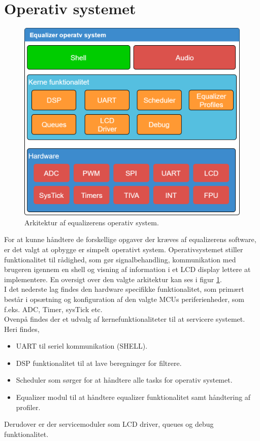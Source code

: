 \section{Operativ systemet}

\begin{figure}[h!]
	\centering
	\includegraphics[width=.5\textwidth]{billeder/eq_os.png}
	\caption{Arkitektur af equalizerens operativ system.}
	\label{fig:eq_os}
\end{figure}

For at kunne håndtere de forskellige opgaver der kræves af equalizerens software, er det valgt at opbygge er simpelt operativt system.
Operativsystemet stiller funktionalitet til rådighed, som gør signalbehandling, kommunikation med brugeren igennem en shell og visning af information i et LCD display lettere at implementere. En oversigt over den valgte arkitektur kan ses i figur \ref{fig:eq_os}.\\

I det nederste lag findes den hardware specifikke funktionalitet, som primært består i opsætning og konfiguration af den valgte MCUs periferienheder, som f.eks. ADC, Timer, sysTick etc.\\
 
Ovenpå findes der et udvalg af kernefunktionaliteter til at servicere systemet. Heri findes,
\begin{itemize}[noitemsep,nolistsep]
	\item UART til seriel kommunikation (SHELL).
	\item DSP funktionalitet til at lave beregninger for filtrere.
	\item Scheduler som sørger for at håndtere alle tasks for operativ systemet.
	\item Equalizer modul til at håndtere equalizer funktionalitet samt håndtering af profiler. 
\end{itemize}
Derudover er der servicemoduler som LCD driver, queues og debug funktionalitet.\\

